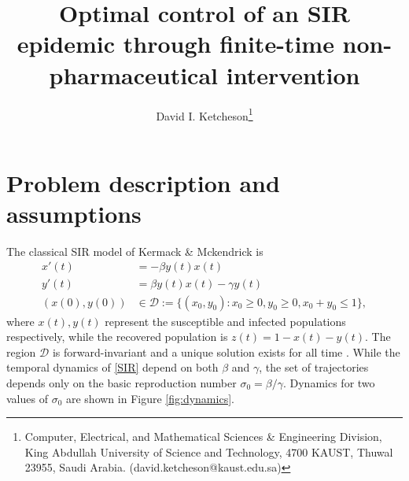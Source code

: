\documentclass[english,12pt,letter]{article}
\newcommand{\Rnot}{\sigma_0}
\newcommand{\dom}{{\mathcal D}}
\begin{document}
\title{Optimal control of an SIR epidemic through finite-time non-pharmaceutical intervention}
\author{
  David I. Ketcheson\thanks{Computer, Electrical, and Mathematical Sciences \& Engineering Division,
King Abdullah University of Science and Technology, 4700 KAUST, Thuwal
23955, Saudi Arabia. (david.ketcheson@kaust.edu.sa)}
}
\maketitle


\section{Problem description and assumptions}
The classical SIR model of Kermack \& Mckendrick \cite{kermack1927contribution} is
\begin{subequations} \label{SIR}
\begin{align} 
    x'(t) & = -\beta y(t) x(t) \label{eq:x} \\
    y'(t) & = \beta y(t) x(t) - \gamma y(t) \label{eq:y} \\
    (x(0),y(0)) & \in \dom := \{(x_0,y_0) : x_0 \ge 0, y_0\ge 0, x_0+y_0 \le 1\},
\end{align}
\end{subequations}
where $x(t), y(t)$ represent the susceptible and infected populations
respectively, while the recovered population is $z(t)=1-x(t)-y(t)$.  The region
$\dom$ is forward-invariant and a unique solution exists for all time
\cite{hethcote2000mathematics}.  While
the temporal dynamics of \eqref{SIR} depend on both $\beta$ and $\gamma$, the set
of trajectories depends only on the basic reproduction number 
$\Rnot = \beta/\gamma$.  Dynamics for two values of $\Rnot$ are
shown in Figure \ref{fig:dynamics}.  
\end{document}
